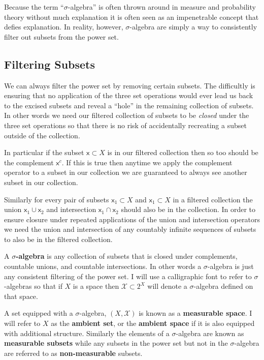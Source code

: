\documentclass[
  letterpaper,
  DIV=11,
  numbers=noendperiod]{scrartcl}
\begin{document}
Because the term ``\(\sigma\)-algebra'' is often thrown around in
measure and probability theory without much explanation it is often seen
as an impenetrable concept that defies explanation. In reality, however,
\(\sigma\)-algebra are simply a way to consistently filter out subsets
from the power set.

\hypertarget{filtering-subsets}{%
\subsection{Filtering Subsets}\label{filtering-subsets}}

We can always filter the power set by removing certain subsets. The
difficultly is ensuring that no application of the three set operations
would ever lead us back to the excised subsets and reveal a ``hole'' in
the remaining collection of subsets. In other words we need our filtered
collection of subsets to be \emph{closed} under the three set operations
so that there is no risk of accidentally recreating a subset outside of
the collection.

In particular if the subset \(\mathsf{x} \subset X\) is in our filtered
collection then so too should be the complement \(\mathsf{x}^{c}\). If
this is true then anytime we apply the complement operator to a subset
in our collection we are guaranteed to always see another subset in our
collection.

Similarly for every pair of subsets \(\mathsf{x}_{1} \subset X\) and
\(\mathsf{x}_{1} \subset X\) in a filtered collection the union
\(\mathsf{x}_{1} \cup \mathsf{x}_{2}\) and intersection
\(\mathsf{x}_{1} \cap \mathsf{x}_{2}\) should also be in the collection.
In order to ensure closure under repeated applications of the union and
intersection operators we need the union and intersection of any
countably infinite sequences of subsets to also be in the filtered
collection.

A \textbf{\(\sigma\)-algebra} is any collection of subsets that is
closed under complements, countable unions, and countable intersections.
In other words a \(\sigma\)-algebra is just any consistent filtering of
the power set. I will use a calligraphic font to refer to
\(\sigma\)-algebras so that if \(X\) is a space then
\(\mathcal{X} \subset 2^{X}\) will denote a \(\sigma\)-algebra defined
on that space.

A set equipped with a \(\sigma\)-algebra, \((X, \mathcal{X})\) is known
as a \textbf{measurable space}. I will refer to \(X\) as the
\textbf{ambient set}, or the \textbf{ambient space} if it is also
equipped with additional structure. Similarly the elements of a
\(\sigma\)-algebra are known as \textbf{measurable subsets} while any
subsets in the power set but not in the \(\sigma\)-algebra are referred
to as \textbf{non-measurable} subsets.
\end{document}

